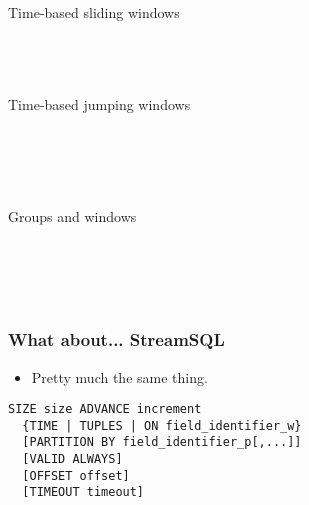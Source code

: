 \documentclass[brown, compress, mathserif]{beamer}
\begin{document}
\begin{frame}{Time-based sliding windows}
  \hlstd{}\hspace*{\fill}\\
  \hlstd{}\hlstd{}\hlsym{(}\hlsym{) }\hlstd{}\\
  \\
  \hlsym{= }\hlstd{}\hlstd{}\hspace*{\fill}\\
\end{frame}


\begin{frame}{Time-based jumping windows}
  \hlstd{}\hspace*{\fill}\\
  \hlstd{}\hspace*{\fill}\\
  \hlstd{}\hlstd{}\hlsym{(}\hlsym{) }\hlstd{}\\
  \\
  \hlsym{= }\hlstd{}\hlstd{}\hspace*{\fill}\\
\end{frame}


\begin{frame}{Groups and windows}
  \hlstd{}\hspace*{\fill}\\
  \hlstd{}\hspace*{\fill}\\
  \hlstd{}\hlstd{}\hlsym{(}\hlsym{) }\hlstd{}\\
  \\
  \hlstd{}\hspace*{\fill}\\
\end{frame}


\begin{frame}[fragile]
  \frametitle{What about... StreamSQL}
  \begin{itemize}
  \item Pretty much the same thing.
  \end{itemize}

\begin{verbatim}
SIZE size ADVANCE increment
  {TIME | TUPLES | ON field_identifier_w}
  [PARTITION BY field_identifier_p[,...]]
  [VALID ALWAYS]
  [OFFSET offset]
  [TIMEOUT timeout]
\end{verbatim}
\end{frame}
\end{document}
